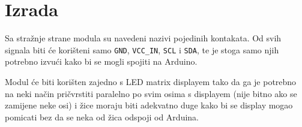 \documentclass[times, utf8, zavrsni, numeric, sort]{fer}
\begin{document}
\section{Izrada}

Sa stražnje strane modula su navedeni nazivi pojedinih kontakata. Od svih signala biti će korišteni samo \texttt{GND}, \texttt{VCC\_IN}, \texttt{SCL} i \texttt{SDA}, te je stoga samo njih potrebno izvući kako bi se mogli spojiti na Arduino.

Modul će biti korišten zajedno s LED matrix displayem tako da ga je potrebno na neki način pričvrstiti paralelno po svim osima s displayem (nije bitno ako se zamijene neke osi) i žice moraju biti adekvatno duge kako bi se display mogao pomicati bez da se neka od žica odspoji od Arduina.
\end{document}
